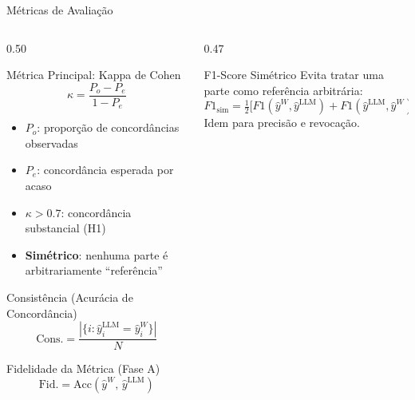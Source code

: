 \documentclass[aspectratio=169, 8pt]{beamer}
\begin{document}
\begin{frame}{Métricas de Avaliação}
  \begin{columns}[T]
    \begin{column}{0.50\textwidth}
      \begin{block}{Métrica Principal: Kappa de Cohen}
        \[
          \kappa = \frac{P_o - P_e}{1 - P_e}
        \]
        \begin{itemize}
          \item $P_o$: proporção de concordâncias observadas
          \item $P_e$: concordância esperada por acaso
          \item $\kappa > 0.7$: concordância substancial (H1)
          \item \textbf{Simétrico}: nenhuma parte é arbitrariamente ``referência''
        \end{itemize}
      \end{block}

      \vspace{0.1em}

      \begin{block}{Consistência (Acurácia de Concordância)}
        \[
          \text{Cons.} = \frac{|\{i: \hat{y}_i^{\text{LLM}} = \hat{y}_i^W\}|}{N}
        \]
      \end{block}

      \vspace{0.1em}

      \begin{block}{Fidelidade da Métrica (Fase A)}
        \[
          \text{Fid.} = \mathrm{Acc}(\hat{y}^W,\, \hat{y}^{\text{LLM}})
        \]
      \end{block}
    \end{column}

    \begin{column}{0.47\textwidth}
      \begin{exampleblock}{F1-Score Simétrico}
        Evita tratar uma parte como referência arbitrária:
        \[
          F1_{\text{sim}} = \tfrac{1}{2}\bigl[F1(\hat{y}^W, \hat{y}^{\text{LLM}})
          + F1(\hat{y}^{\text{LLM}}, \hat{y}^W)\bigr]
        \]
        Idem para precisão e revocação.
      \end{exampleblock}

      \vspace{0.1em}


\end{column}
\end{columns}
\end{frame}
\end{document}
